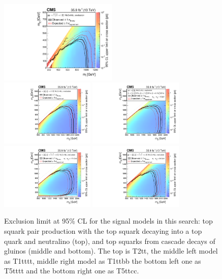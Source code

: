 \begin{figure}[ht!]
 \begin{centering}
  \includegraphics[width=0.50\textwidth]{sections/mc4/Results/figures/Covered_T2tt_OnlyXSEC.pdf}\\
  \includegraphics[width=0.40\textwidth]{sections/mc4/Results/figures/T1tttt_OnlyXSEC.pdf}
  \includegraphics[width=0.40\textwidth]{sections/mc4/Results/figures/T1ttbb_OnlyXSEC.pdf}\\
  \includegraphics[width=0.40\textwidth]{sections/mc4/Results/figures/T5ttttdM175_OnlyXSEC.pdf}
  \includegraphics[width=0.40\textwidth]{sections/mc4/Results/figures/T5ttcc_OnlyXSEC.pdf}\\
  \caption{Exclusion limit at 95\% CL for the signal models in this search: top squark pair production with the top squark decaying into a top quark and neutralino (top), and top squarks from cascade decays of gluinos (middle and bottom). The top is T2tt, the middle left model as T1tttt, middle right model as T1ttbb the bottom left one as T5tttt and the bottom right one as T5ttcc.}
  \label{fig:signal_diagrams}
 \end{centering}
\end{figure}

